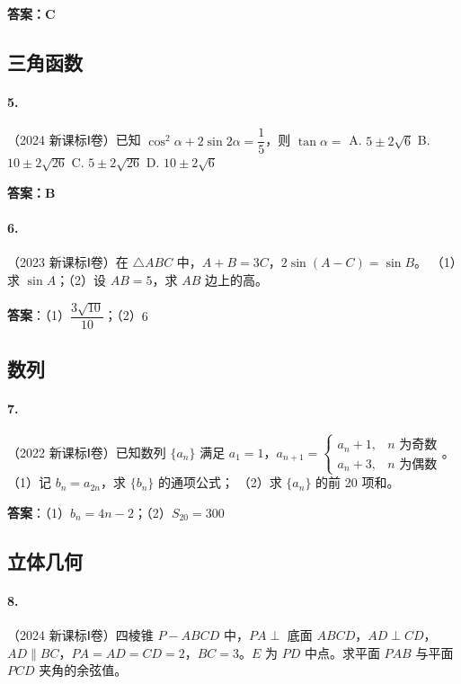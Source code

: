 \textbf{答案：C}

\subsection{三角函数}

\paragraph{5.}（2024 新课标Ⅰ卷）已知 $\cos^2\alpha + 2\sin2\alpha = \dfrac15$，则 $\tan\alpha =$
A. $5\pm2\sqrt6$ \quad B. $10\pm2\sqrt{26}$ \quad C. $5\pm2\sqrt{26}$ \quad D. $10\pm2\sqrt6$

\textbf{答案：B}

\paragraph{6.}（2023 新课标Ⅰ卷）在 $\triangle ABC$ 中，$A+B=3C$，$2\sin(A-C)=\sin B$。
（1）求 $\sin A$；（2）设 $AB=5$，求 $AB$ 边上的高。

\textbf{答案}：（1）$\dfrac{3\sqrt{10}}{10}$；（2）$6$

\subsection{数列}

\paragraph{7.}（2022 新课标Ⅰ卷）已知数列 $\{a_n\}$ 满足 $a_1=1$，$a_{n+1} = \begin{cases}a_n+1, & n\text{ 为奇数} \\ a_n+3, & n\text{ 为偶数}\end{cases}$。
（1）记 $b_n = a_{2n}$，求 $\{b_n\}$ 的通项公式；
（2）求 $\{a_n\}$ 的前 20 项和。

\textbf{答案}：（1）$b_n = 4n-2$；（2）$S_{20}=300$

\subsection{立体几何}

\paragraph{8.}（2024 新课标Ⅰ卷）四棱锥 $P-ABCD$ 中，$PA\perp$ 底面 $ABCD$，$AD\perp CD$，$AD\parallel BC$，$PA=AD=CD=2$，$BC=3$。$E$ 为 $PD$ 中点。求平面 $PAB$ 与平面 $PCD$ 夹角的余弦值。


